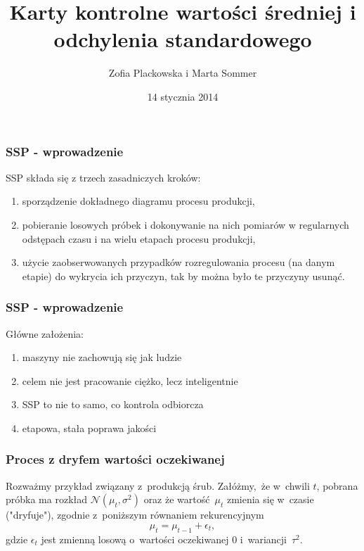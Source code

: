 \documentclass[11pt,usenames,dvipsnames,svgnames,x11names]{beamer}
\date{14 stycznia 2014}
\author{Zofia Plackowska i Marta Sommer}
\title{Karty kontrolne wartości średniej i odchylenia standardowego}
\theoremstyle{plain}
\theoremstyle{definition}
\theoremstyle{remark}
\begin{document}
\begin{frame}   %
\titlepage
\end{frame}


\begin{frame}
\frametitle{SSP - wprowadzenie}
SSP składa się z trzech zasadniczych kroków:
\begin{enumerate}
\item sporządzenie dokładnego diagramu procesu produkcji,
\item pobieranie losowych próbek i dokonywanie na nich pomiarów w regularnych odstępach czasu i na wielu etapach procesu produkcji,
\item użycie zaobserwowanych przypadków rozregulowania procesu (na danym etapie) do wykrycia ich przyczyn, tak by można było te przyczyny usunąć. 
\end{enumerate} 
\end{frame}

\begin{frame}
\frametitle{SSP - wprowadzenie}
Główne założenia:
\begin{enumerate}
\item maszyny nie zachowują się jak ludzie
\item celem nie jest pracowanie ciężko, lecz inteligentnie
\item SSP to nie to samo, co kontrola odbiorcza
\item etapowa, stała poprawa jakości 
\end{enumerate}
\end{frame}



\begin{frame}   
\frametitle{Proces z dryfem wartości oczekiwanej}
	
Rozważmy przykład związany z~produkcją śrub. Załóżmy,~że w~chwili $t$, pobrana próbka ma rozkład $\mathcal{N}(\mu_t,\sigma^2)$ oraz że wartość~$\mu_t$ zmienia się w~czasie ("dryfuje"), zgodnie z~poniższym równaniem rekurencyjnym $$\mu_t=\mu_{t-1}+\epsilon_t,$$gdzie $\epsilon_t$ jest zmienną losową o~wartości oczekiwanej $0$ i~wariancji~$\tau^2$. 
	
\end{frame}
\end{document}
